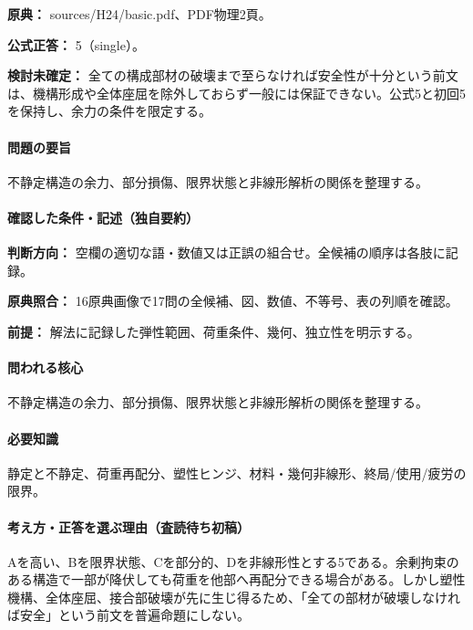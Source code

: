 \noindent\textbf{原典：} sources/H24/basic.pdf、PDF物理2頁。

\textbf{公式正答：} 5（single）。

\par\textbf{検討未確定：} 全ての構成部材の破壊まで至らなければ安全性が十分という前文は、機構形成や全体座屈を除外しておらず一般には保証できない。公式5と初回5を保持し、余力の条件を限定する。

\paragraph{問題の要旨} 不静定構造の余力、部分損傷、限界状態と非線形解析の関係を整理する。

\paragraph{確認した条件・記述（独自要約）}\mbox{}\par

\noindent\textbf{判断方向：} 空欄の適切な語・数値又は正誤の組合せ。全候補の順序は各肢に記録。\par

\noindent\textbf{原典照合：} 16原典画像で17問の全候補、図、数値、不等号、表の列順を確認。\par

\noindent\textbf{前提：} 解法に記録した弾性範囲、荷重条件、幾何、独立性を明示する。\par

\paragraph{問われる核心} 不静定構造の余力、部分損傷、限界状態と非線形解析の関係を整理する。

\paragraph{必要知識} 静定と不静定、荷重再配分、塑性ヒンジ、材料・幾何非線形、終局/使用/疲労の限界。

\paragraph{考え方・正答を選ぶ理由（査読待ち初稿）} Aを高い、Bを限界状態、Cを部分的、Dを非線形性とする5である。余剰拘束のある構造で一部が降伏しても荷重を他部へ再配分できる場合がある。しかし塑性機構、全体座屈、接合部破壊が先に生じ得るため、「全ての部材が破壊しなければ安全」という前文を普遍命題にしない。

